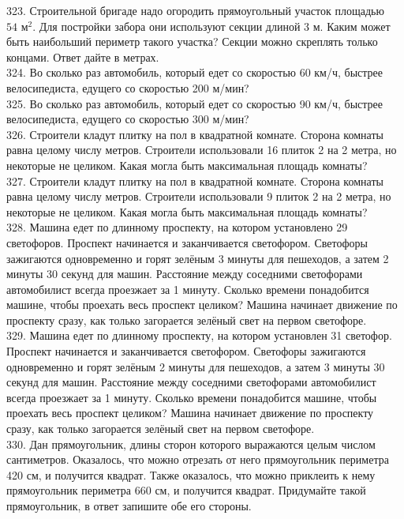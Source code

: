 323. Строительной бригаде надо огородить прямоугольный участок площадью $54\text{ м}^2.$ Для постройки забора они используют секции длиной 3 м. Каким может быть
наибольший периметр такого участка? Секции можно скреплять только концами. Ответ дайте в метрах.\\
324. Во сколько раз автомобиль, который едет со скоростью 60 км/ч, быстрее велосипедиста, едущего со скоростью 200 м/мин?\\
325. Во сколько раз автомобиль, который едет со скоростью 90 км/ч, быстрее велосипедиста, едущего со скоростью 300 м/мин?\\
326. Строители кладут плитку на пол в квадратной комнате. Сторона комнаты равна целому числу метров. Строители использовали 16 плиток 2 на 2 метра,
но некоторые не целиком. Какая могла быть максимальная площадь комнаты?\\
327. Строители кладут плитку на пол в квадратной комнате. Сторона комнаты равна целому числу метров. Строители использовали 9 плиток 2 на 2 метра,
но некоторые не целиком. Какая могла быть максимальная площадь комнаты?\\
328. Машина едет по длинному проспекту, на котором установлено 29 светофоров. Проспект начинается и заканчивается светофором. Светофоры зажигаются одновременно и горят зелёным 3 минуты для пешеходов, а затем 2 минуты 30 секунд для машин. Расстояние между соседними
светофорами автомобилист всегда проезжает за 1 минуту. Сколько времени понадобится машине, чтобы проехать весь проспект целиком? Машина начинает движение по проспекту сразу, как только загорается зелёный свет на первом светофоре.\\
329. Машина едет по длинному проспекту, на котором установлен 31 светофор. Проспект начинается и заканчивается светофором. Светофоры зажигаются одновременно и горят зелёным 2 минуты для пешеходов, а затем 3 минуты 30 секунд для машин. Расстояние между соседними светофорами автомобилист всегда проезжает за 1 минуту. Сколько времени понадобится машине, чтобы проехать весь проспект целиком? Машина начинает движение по проспекту сразу, как только загорается зелёный свет на первом светофоре.\\
330. Дан прямоугольник, длины сторон которого выражаются целым числом сантиметров. Оказалось, что можно отрезать от него прямоугольник периметра 420 см, и получится квадрат. Также оказалось, что можно приклеить к нему прямоугольник периметра 660 см, и получится квадрат. Придумайте такой прямоугольник, в ответ запишите обе его стороны.\\
